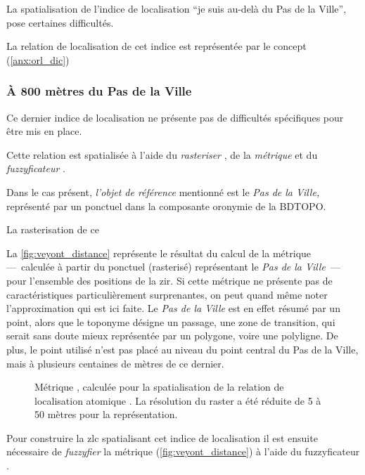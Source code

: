La spatialisation de l'indice de localisation \enquote{je suis au-delà
  du Pas de la Ville}, pose certaines difficultés.

La relation de localisation de cet indice est représentée par le
concept 
(\autoref{anx:orl_dic})

\subsubsection{À 800 mètres du Pas de la Ville}

Ce dernier indice de localisation ne présente pas de difficultés
spécifiques pour être mis en place.


Cette relation est spatialisée à l'aide du \emph{rasteriser}
, de la \emph{métrique}
 et du \emph{fuzzyficateur}
.

Dans le cas présent, \emph{l'objet de référence} mentionné est le
\emph{Pas de la Ville,} représenté par un ponctuel dans la composante
oronymie de la BDTOPO.


La rasterisation de ce



La \autoref{fig:veyont_distance} représente le résultat du calcul de
la métrique  ---~calculée à partir du ponctuel
(rasterisé) représentant le \emph{Pas de la Ville}~--- pour l'ensemble
des positions de la \ac{zir}. Si cette métrique ne présente pas de
caractéristiques particulièrement surprenantes, on peut quand même
noter l'approximation qui est ici faite. Le \emph{Pas de la Ville} est
en effet résumé par un point, alors que le toponyme désigne un
passage, une zone de transition, qui serait sans doute mieux
représentée par un polygone, voire une polyligne. De plus, le point
utilisé n'est pas placé au niveau du point central du Pas de la Ville,
mais à plusieurs centaines de mètres de ce dernier.


\begin{figure}
  \centering
  
  \caption{Métrique \protect{}, calculée pour la
    spatialisation de la relation de localisation atomique
    \protect{}. La résolution
    du raster a été réduite de 5 à 50 mètres pour la représentation.}
  \label{fig:veyont_distance}
\end{figure}

Pour construire la \ac{zlc} spatialisant cet indice de localisation il
est ensuite nécessaire de \emph{fuzzyfier} la métrique
(\autoref{fig:veyont_distance}) à l'aide du fuzzyficateur
.

